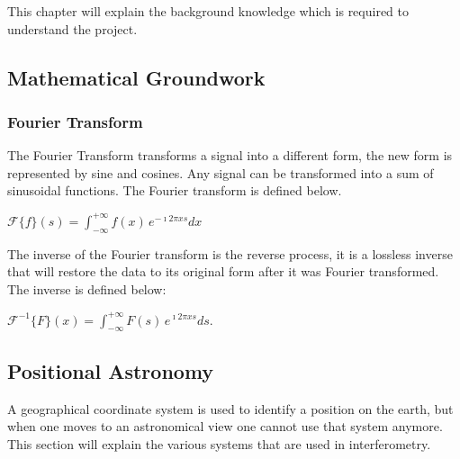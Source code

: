 This chapter will explain the background knowledge which is required to understand the project.
\subsection{Mathematical Groundwork}
\subsubsection{Fourier Transform}
The Fourier Transform transforms a signal into a different form, the new form is represented by sine and cosines. Any signal can be transformed into a sum of sinusoidal functions\cite{Fourier}. The Fourier transform is defined below.\\
\begin{center}
$\mathcal{F}\{f\}(s) = \int_{-\infty}^{+\infty}f(x)\,e^{-\imath 2\pi xs}dx$    
\end{center}
The inverse of the Fourier transform is the reverse process, it is a lossless inverse that will restore the data to its original form after it was Fourier transformed. The inverse is defined below:
\begin{center}
$\mathcal{F}^{-1}\{F\}(x) = \int_{-\infty}^{+\infty}F(s)\,e^{\imath 2\pi xs}ds$.
\end{center}

\subsection{Positional Astronomy}
A geographical coordinate system is used to identify a position on the earth, but when one moves to an astronomical view one cannot use that system anymore. This section will explain the various systems that are used in interferometry\cite{TEXTBOOK}\cite{Astronomy}. 
